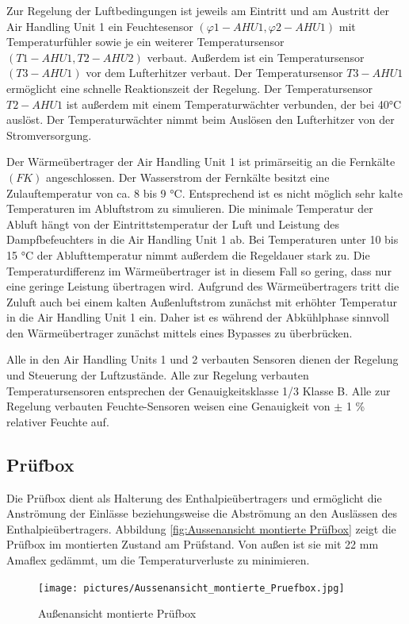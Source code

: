 Zur Regelung der Luftbedingungen ist jeweils am Eintritt und am Austritt der Air Handling Unit 1 ein Feuchtesensor $(\varphi1-AHU1, \varphi2-AHU1)$ mit Temperaturfühler sowie je ein weiterer Temperatursensor $(T1-AHU1, T2-AHU2)$ verbaut. Außerdem ist ein Temperatursensor $(T3-AHU1)$ vor dem Lufterhitzer verbaut. 
Der Temperatursensor $T3-AHU1$ ermöglicht eine schnelle Reaktionszeit der Regelung. Der Temperatursensor $T2-AHU1$ ist außerdem mit einem Temperaturwächter verbunden, der bei 40°C auslöst. Der Temperaturwächter nimmt beim Auslösen den Lufterhitzer von der Stromversorgung.

Der Wärmeübertrager der Air Handling Unit 1 ist primärseitig an die Fernkälte $(FK)$ angeschlossen. Der Wasserstrom der Fernkälte besitzt eine Zulauftemperatur von ca. 8 bis 9 °C. Entsprechend ist es nicht möglich sehr kalte Temperaturen im Abluftstrom zu simulieren. Die minimale Temperatur der Abluft hängt von der Eintrittstemperatur der Luft und Leistung des Dampfbefeuchters in die Air Handling Unit 1 ab. Bei Temperaturen unter 10 bis 15 °C der Ablufttemperatur nimmt außerdem die Regeldauer stark zu. Die Temperaturdifferenz im Wärmeübertrager ist in diesem Fall so gering, dass nur eine geringe Leistung übertragen wird. Aufgrund des Wärmeübertragers tritt die Zuluft auch bei einem kalten Außenluftstrom zunächst mit erhöhter Temperatur in die Air Handling Unit 1 ein. Daher ist es während der Abkühlphase sinnvoll den Wärmeübertrager zunächst mittels eines Bypasses zu überbrücken. 


Alle in den Air Handling Units 1 und 2 verbauten Sensoren dienen der Regelung und Steuerung der Luftzustände. Alle zur Regelung verbauten Temperatursensoren entsprechen der Genauigkeitsklasse 1/3 Klasse B. Alle zur Regelung verbauten Feuchte-Sensoren weisen eine Genauigkeit von $\pm$ 1 \% relativer Feuchte auf.

\subsection{Prüfbox}
\label{Prüfbox}

Die Prüfbox dient als Halterung des Enthalpieübertragers und ermöglicht die Anströmung der Einlässe beziehungsweise die Abströmung an den Auslässen des Enthalpieübertragers. Abbildung \ref{fig:Aussenansicht montierte Prüfbox} zeigt die Prüfbox im montierten Zustand am Prüfstand. Von außen ist sie mit 22 mm Amaflex gedämmt, um die Temperaturverluste zu minimieren.

\begin{figure} [h]
	\centering
	\texttt{[image: pictures/Aussenansicht\_montierte\_Pruefbox.jpg]}
	\caption{Außenansicht montierte Prüfbox}
	\label{fig:Aussenansicht montierte Pruefbox}
\end{figure}

